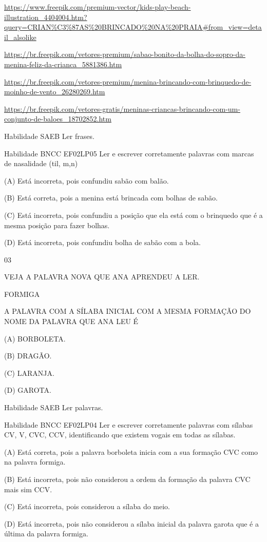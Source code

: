 {{\url{https://www.freepik.com/premium-vector/kids-play-beach-illustration_4404004.htm?query=CRIAN\%C3\%87AS\%20BRINCADO\%20NA\%20PRAIA\#from_view=detail_alsolike}

\url{https://br.freepik.com/vetores-premium/sabao-bonito-da-bolha-do-sopro-da-menina-feliz-da-crianca_5881386.htm}

\url{https://br.freepik.com/vetores-premium/menina-brincando-com-brinquedo-de-moinho-de-vento_26280269.htm}

\url{https://br.freepik.com/vetores-gratis/meninas-criancas-brincando-com-um-conjunto-de-baloes_18702852.htm}

Habilidade SAEB Ler frases.

Habilidade BNCC EF02LP05 Ler e escrever corretamente palavras com marcas
de nasalidade (til, m,n)

(A) Está incorreta, pois confundiu sabão com balão.

(B) Está correta, pois a menina está brincada com bolhas de sabão.

(C) Está incorreta, pois confundiu a posição que ela está com o
brinquedo que é a mesma posição para fazer bolhas.

(D) Está incorreta, pois confundiu bolha de sabão com a bola.

\num{03}

VEJA A PALAVRA NOVA QUE ANA APRENDEU A LER.

FORMIGA

A PALAVRA COM A SÍLABA INICIAL COM A MESMA FORMAÇÃO DO NOME DA PALAVRA
QUE ANA LEU É

(A) BORBOLETA.

(B) DRAGÃO.

(C) LARANJA.

(D) GAROTA.

Habilidade SAEB Ler palavras.

Habilidade BNCC EF02LP04 Ler e escrever corretamente palavras com
sílabas CV, V, CVC, CCV, identificando que existem vogais em todas as
sílabas.

(A) Está correta, pois a palavra borboleta inicia com a sua formação CVC
como na palavra formiga.

(B) Está incorreta, pois não considerou a ordem da formação da palavra
CVC mais sim CCV.

(C) Está incorreta, pois considerou a sílaba do meio.

(D) Está incorreta, pois não considerou a sílaba inicial da palavra
garota que é a última da palavra formiga.

}}
